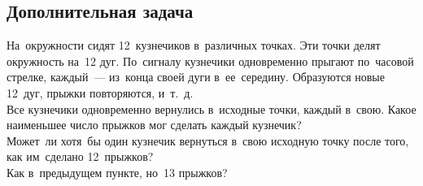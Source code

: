 

\subsection*{Дополнительная задача}



\begin{problems}

\item
На~окружности сидят 12~кузнечиков в~различных точках.
Эти точки делят окружность на~12 дуг.
По~сигналу кузнечики одновременно прыгают по~часовой стрелке, каждый~---
из~конца своей дуги в~ее~середину.
Образуются новые 12~дуг, прыжки повторяются, и~т.~д.
\\
\subproblem
Все кузнечики одновременно вернулись в~исходные точки, каждый в~свою.
Какое наименьшее число прыжков мог сделать каждый кузнечик?
\\
\subproblem
Может~ли хотя~бы один кузнечик вернуться в~свою исходную точку после того, как
им~сделано 12~прыжков?
\\
\subproblem
Как в~предыдущем пункте, но~13 прыжков?

\end{problems}

